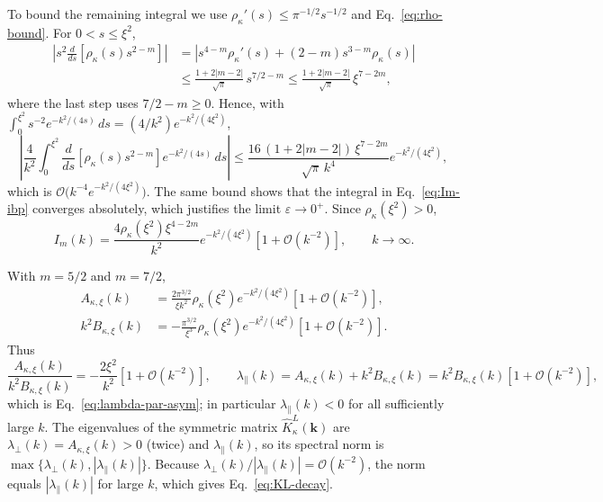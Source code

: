 \documentclass[11pt]{article}
\theoremstyle{plain}
\newcommand{\kk}{\bm k}
\DeclareRobustCommand{\_}{\textunderscore\allowbreak}
\begin{document}
To bound the remaining integral we use
$\rho_\kappa'(s)\le\pi^{-1/2}s^{-1/2}$ and
Eq.~\eqref{eq:rho-bound}. For $0<s\le\xi^2$,
\begin{equation}
\begin{aligned}
\left|
s^2\frac{d}{ds}\!\left[\rho_\kappa(s)s^{2-m}\right]
\right|
&=
\left|
s^{4-m}\rho_\kappa'(s)+(2-m)s^{3-m}\rho_\kappa(s)
\right|
\\
&\le
\frac{1+2|m-2|}{\sqrt{\pi}}\,s^{7/2-m}
\le
\frac{1+2|m-2|}{\sqrt{\pi}}\,\xi^{7-2m},
\end{aligned}
\end{equation}
where the last step uses $7/2-m\ge0$. Hence, with
$\int_0^{\xi^2}s^{-2}e^{-k^2/(4s)}\,ds=(4/k^2)e^{-k^2/(4\xi^2)}$,
\begin{equation}
\left|
\frac{4}{k^2}
\int_0^{\xi^2}
\frac{d}{ds}\!\left[\rho_\kappa(s)s^{2-m}\right]
e^{-k^2/(4s)}\,ds
\right|
\le
\frac{16\,(1+2|m-2|)\,\xi^{7-2m}}{\sqrt{\pi}\,k^4}
e^{-k^2/(4\xi^2)} ,
\end{equation}
which is $\mathcal O\bigl(k^{-4}e^{-k^2/(4\xi^2)}\bigr)$. The same bound
shows that the integral in Eq.~\eqref{eq:Im-ibp} converges absolutely, which
justifies the limit $\varepsilon\to0^+$. Since $\rho_\kappa(\xi^2)>0$,
\begin{equation}
I_m(k)
=
\frac{4\rho_\kappa(\xi^2)\xi^{4-2m}}{k^2}
e^{-k^2/(4\xi^2)}
\left[1+\mathcal O(k^{-2})\right],
\qquad k\to\infty .
\end{equation}

With $m=5/2$ and $m=7/2$,
\begin{align}
A_{\kappa,\xi}(k)
&=
\frac{2\pi^{3/2}}{\xi k^2}\rho_\kappa(\xi^2)e^{-k^2/(4\xi^2)}
\left[1+\mathcal O(k^{-2})\right],
\\
k^2B_{\kappa,\xi}(k)
&=
-\frac{\pi^{3/2}}{\xi^3}\rho_\kappa(\xi^2)e^{-k^2/(4\xi^2)}
\left[1+\mathcal O(k^{-2})\right].
\end{align}
Thus
\begin{equation}
\frac{A_{\kappa,\xi}(k)}{k^2B_{\kappa,\xi}(k)}
=
-\frac{2\xi^2}{k^2}\left[1+\mathcal O(k^{-2})\right],
\qquad
\lambda_\parallel(k)
=
A_{\kappa,\xi}(k)+k^2B_{\kappa,\xi}(k)
=
k^2B_{\kappa,\xi}(k)\left[1+\mathcal O(k^{-2})\right],
\end{equation}
which is Eq.~\eqref{eq:lambda-par-asym}; in particular $\lambda_\parallel(k)<0$ for
all sufficiently large $k$. The eigenvalues of the symmetric matrix
$\widehat K_\kappa^L(\kk)$ are $\lambda_\perp(k)=A_{\kappa,\xi}(k)>0$
(twice) and $\lambda_\parallel(k)$, so its spectral norm is
$\max\{\lambda_\perp(k),|\lambda_\parallel(k)|\}$. Because
$\lambda_\perp(k)/|\lambda_\parallel(k)|=\mathcal O(k^{-2})$, the norm equals
$|\lambda_\parallel(k)|$ for large $k$, which gives Eq.~\eqref{eq:KL-decay}.
\end{document}
